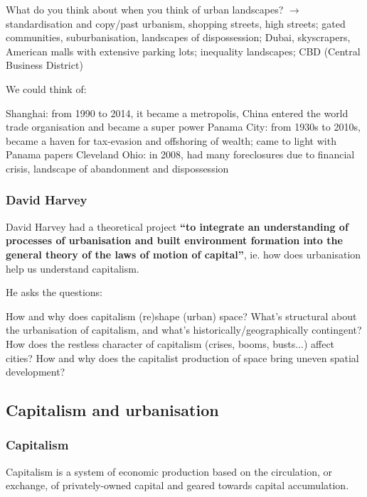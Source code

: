 \documentclass{article}
\begin{document}
What do you think about when you think of urban landscapes? $\rightarrow$ standardisation and copy/past urbanism, shopping streets, high streets; gated communities, suburbanisation, landscapes of dispossession; Dubai, skyscrapers, American malls with extensive parking lots; inequality landscapes; CBD (Central Business District)

We could think of:

\begin{outline}
	\1 Shanghai: from 1990 to 2014, it became a metropolis, China entered the world trade organisation and became a super power
	\1 Panama City: from 1930s to 2010s, became a haven for tax-evasion and offshoring of wealth; came to light with Panama papers
	\1 Cleveland Ohio: in 2008, had many foreclosures due to financial crisis, landscape of abandonment and dispossession 
\end{outline}

\subsubsection{David Harvey}

David Harvey had a theoretical project \textbf{``to integrate an understanding of processes of urbanisation and built environment formation into the general theory of the laws of motion of capital''}, ie. how does urbanisation help us understand capitalism.

He asks the questions:

\begin{outline}
	\1 How and why does capitalism (re)shape (urban) space?
	\1 What's structural about the urbanisation of capitalism, and what's historically/geographically contingent?
	\1 How does the restless character of capitalism (crises, booms, busts...) affect cities?
	\1 How and why does the capitalist production of space bring uneven spatial development?
\end{outline}

\subsection{Capitalism and urbanisation}

\subsubsection{Capitalism}

Capitalism is a system of economic production based on the circulation, or exchange, of privately-owned capital and geared towards capital accumulation. 
\end{document}
